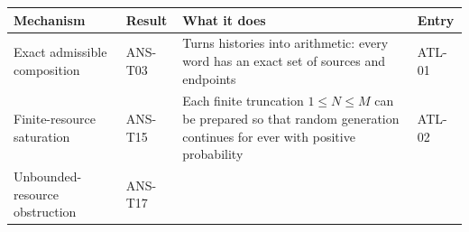 \documentclass[
  11pt,
]{article}
\begin{document}
\begin{longtable}[]{@{}llll@{}}
\toprule
\begin{minipage}[b]{0.23\columnwidth}\raggedright
Mechanism\strut
\end{minipage} & \begin{minipage}[b]{0.13\columnwidth}\raggedright
Result\strut
\end{minipage} & \begin{minipage}[b]{0.41\columnwidth}\raggedright
What it does\strut
\end{minipage} & \begin{minipage}[b]{0.11\columnwidth}\raggedright
Entry\strut
\end{minipage}\tabularnewline
\midrule
\endhead
\begin{minipage}[t]{0.23\columnwidth}\raggedright
Exact admissible composition\strut
\end{minipage} & \begin{minipage}[t]{0.13\columnwidth}\raggedright
ANS-T03\strut
\end{minipage} & \begin{minipage}[t]{0.41\columnwidth}\raggedright
Turns histories into arithmetic: every word has an exact set of sources
and endpoints\strut
\end{minipage} & \begin{minipage}[t]{0.11\columnwidth}\raggedright
ATL-01\strut
\end{minipage}\tabularnewline
\begin{minipage}[t]{0.23\columnwidth}\raggedright
Finite-resource saturation\strut
\end{minipage} & \begin{minipage}[t]{0.13\columnwidth}\raggedright
ANS-T15\strut
\end{minipage} & \begin{minipage}[t]{0.41\columnwidth}\raggedright
Each finite truncation \(1\le N\le M\) can be prepared so that random
generation continues for ever with positive probability\strut
\end{minipage} & \begin{minipage}[t]{0.11\columnwidth}\raggedright
ATL-02\strut
\end{minipage}\tabularnewline
\begin{minipage}[t]{0.23\columnwidth}\raggedright
Unbounded-resource obstruction\strut
\end{minipage} & \begin{minipage}[t]{0.13\columnwidth}\raggedright
ANS-T17\strut
\end{minipage} & \begin{minipage}[t]{0.41\columnwidth}\raggedright

\end{minipage}
\end{longtable}
\end{document}
